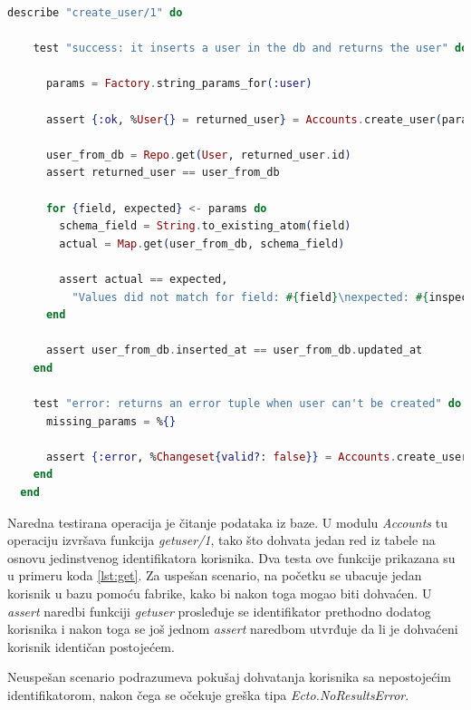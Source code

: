 \documentclass[12pt,oneside]{memoir}
\begin{document}
\begin{lstlisting}[language=elixir, caption={Testiranje funkcije \emph{create{\textunderscore}user/1}},captionpos=b, label={lst:create}]
describe "create_user/1" do

    test "success: it inserts a user in the db and returns the user" do

      params = Factory.string_params_for(:user)

      assert {:ok, %User{} = returned_user} = Accounts.create_user(params)

      user_from_db = Repo.get(User, returned_user.id)
      assert returned_user == user_from_db

      for {field, expected} <- params do
        schema_field = String.to_existing_atom(field)
        actual = Map.get(user_from_db, schema_field)

        assert actual == expected,
          "Values did not match for field: #{field}\nexpected: #{inspect(expected)}\nactual: #{inspect(actual)}"
      end

      assert user_from_db.inserted_at == user_from_db.updated_at
    end

    test "error: returns an error tuple when user can't be created" do
      missing_params = %{}

      assert {:error, %Changeset{valid?: false}} = Accounts.create_user(missing_params)
    end
  end
\end{lstlisting}
 
\par Naredna testirana operacija je čitanje podataka iz baze. U modulu \emph{Accounts} tu operaciju izvršava funkcija \emph{get{\textunderscore}user/1}, tako što dohvata jedan red iz tabele na osnovu jedinstvenog identifikatora korisnika. Dva testa ove funkcije prikazana su u primeru koda \ref{lst:get}. Za uspešan scenario, na početku se ubacuje jedan korisnik u bazu pomoću fabrike, kako bi nakon toga mogao biti dohvaćen. U \emph{assert} naredbi funkciji \emph{get{\textunderscore}user} prosleđuje se identifikator prethodno dodatog korisnika i nakon toga se još jednom \emph{assert} naredbom utvrđuje da li je dohvaćeni korisnik identičan postojećem.
\par Neuspešan scenario podrazumeva pokušaj dohvatanja korisnika sa nepostojećim identifikatorom, nakon čega se očekuje greška tipa \emph{Ecto.NoResultsError}.
 
\end{document}
